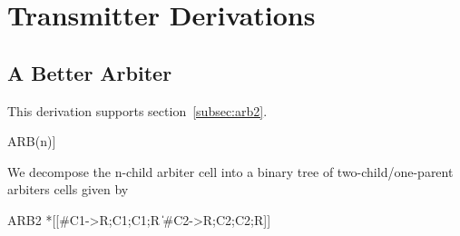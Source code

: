 \documentclass[aer.tex]{subfiles}
\begin{document}
\section{Transmitter Derivations}

\subsection{A Better Arbiter}
\label{subsec:arb2_derivation}

This derivation supports section~\ref{subsec:arb2}.

\begin{csp}
ARB(n)\equiv*[[\langle\|i:1..n:#{Ci}->Ci;Ci\rangle]]
\end{csp}

\noindent We decompose the n-child arbiter cell into a binary tree of 
two-child/one-parent arbiters cells given by

\begin{csp}
ARB2\equiv
  *[[#{C1}->R;C1;C1;R
    \|#{C2}->R;C2;C2;R]]
\end{csp}
\end{document}
